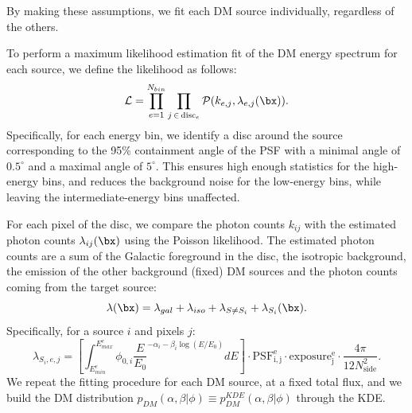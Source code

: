 By making these assumptions, we fit each DM source individually, regardless of the others.

To perform a maximum likelihood estimation fit of the DM energy spectrum for each source, we define the likelihood as follows:
\begin{equation}
    \mathcal{L} = \prod_{e=1}^{N_{bin}} \prod_{j \, \in \, \textrm{disc}_e}  
    \mathcal{P}(k_{e,j}, \lambda_{e,j}(\bx)).
\end{equation}
Specifically, for each energy bin, we identify a disc around the source corresponding to the 95\% containment angle of the PSF with a minimal angle of $0.5^\circ$ and a maximal angle of $5^\circ$.
This ensures high enough statistics for the high-energy bins, and reduces the background noise for the low-energy bins, while leaving the intermediate-energy bins unaffected. 


For each pixel of the disc, we compare the photon counts $k_{ij}$ with the estimated photon counts $\lambda_{ij}(\bx)$ using the Poisson likelihood. The estimated photon counts are a sum of the Galactic foreground in the disc, the isotropic background, the emission of the other background (fixed) DM sources and the photon counts coming from the target source:
\begin{equation}
    \lambda(\bx) = \lambda_{gal} + \lambda_{iso} + \lambda_{S \neq S_i} + \lambda_{S_i}(\bx).
\end{equation}
Specifically, for a source $i$ and pixels $j$:
\begin{equation}
    \lambda_{S_i, e,j} = \left[\int_{E_{min}^e}^{E_{max}^e} \phi_{0,i}\frac{E}{E_0}^{-\alpha_i - \beta_i\log(E/E_0)} dE\right] \cdot \mathrm{PSF_{i,j}^e} \cdot \mathrm{exposure_{j}^e} \cdot \frac{4\pi}{12 N_\mathrm{side}^2}.
    \label{eq:lambda}
\end{equation}
We repeat the fitting procedure for each DM source, at a fixed total flux, and we build the DM distribution $p_{DM}(\alpha, \beta|\phi)\equiv p_{DM}^{KDE}(\alpha, \beta|\phi)$ through the KDE.

